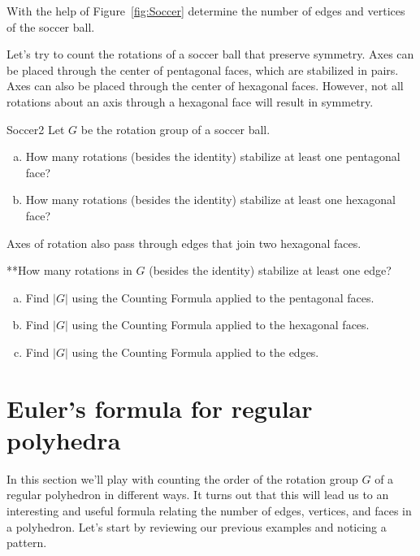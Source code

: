 \begin{exercise}\label{exercise:actions:Soccer1}
With the help of Figure~\ref{fig:Soccer} determine the number of edges and vertices of the soccer ball. 
\end {exercise}

Let's try to count the rotations of a soccer ball that preserve symmetry.  Axes can be placed through the center of pentagonal faces, which are stabilized in pairs.  Axes can also be placed through the center of hexagonal faces.  However, not all rotations about an axis through a hexagonal face will result in symmetry.

\begin {exercise}{Soccer2}
Let $G$ be the rotation group of a soccer ball. 
\begin{enumerate}[(a)]
\item How many rotations (besides the identity) stabilize at least one pentagonal face? 
\item How many rotations (besides the identity) stabilize at least one hexagonal face?
\end{enumerate}
\end {exercise}

Axes of rotation also pass through edges that join two hexagonal faces. 

\begin{exercise}\label{exercise:actions:Soccer3}
**How many rotations in $G$ (besides the identity) stabilize at least one edge?
\end {exercise}

\begin{exercise}\label{exercise:actions:Soccer4}
\begin{enumerate}[(a)]
\item Find $|G|$ using the Counting Formula applied to the pentagonal faces.
\item Find $|G|$ using the Counting Formula applied to the hexagonal faces.
\item Find $|G|$ using the Counting Formula applied to the edges.
\end{enumerate}
\end{exercise}

\section{Euler's formula for regular polyhedra}
In this section we'll play with counting the order of the rotation group $G$ of a regular polyhedron in different ways. It turns out that this will lead us to an interesting and useful formula relating the number of edges, vertices, and faces in a polyhedron.
Let's start by reviewing our previous examples and noticing a pattern.


